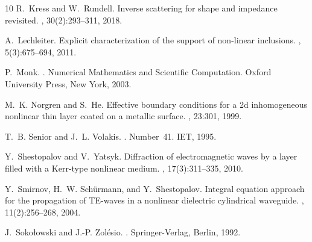 \documentclass[12pt,reqno]{amsart}
\theoremstyle{definition}
\numberwithin{equation}{section}
\begin{document}
\begin{thebibliography}{10}
R.~Kress and W.~Rundell.
\newblock Inverse scattering for shape and impedance revisited.
, 30(2):293--311, 2018.

A.~Lechleiter.
\newblock Explicit characterization of the support of non-linear inclusions.
, 5(3):675--694, 2011.

P.~Monk.
.
\newblock Numerical Mathematics and Scientific Computation. Oxford University
  Press, New York, 2003.

M.~K. Norgren and S.~He.
\newblock Effective boundary conditions for a 2d inhomogeneous nonlinear thin
  layer coated on a metallic surface.
, 23:301, 1999.

T.~B. Senior and J.~L. Volakis.
.
\newblock Number~41. IET, 1995.

Y.~Shestopalov and V.~Yatsyk.
\newblock Diffraction of electromagnetic waves by a layer filled with a
  {K}err-type nonlinear medium.
, 17(3):311--335, 2010.

Y.~Smirnov, H.~W. Sch\"{u}rmann, and Y.~Shestopalov.
\newblock Integral equation approach for the propagation of {TE}-waves in a
  nonlinear dielectric cylindrical waveguide.
, 11(2):256--268, 2004.

J.~Soko{\l}owski and J.-P. Zol{\'e}sio.
.
\newblock Springer-Verlag, Berlin, 1992.

\end{thebibliography}



%
%
\end{document}
